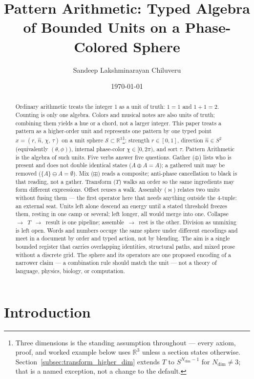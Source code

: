 \documentclass[12pt, a4paper]{article}
\title{Pattern Arithmetic: Typed Algebra of Bounded Units on a Phase-Colored Sphere}
\author{Sandeep Lakshminarayan Chiluveru}
\date{\today}
\begin{document}
\maketitle

\begin{abstract}
Ordinary arithmetic treats the integer 1 as a unit of truth: $1=1$ and $1+1=2$. Counting is only one algebra. Colors and musical notes are also units of truth; combining them yields a hue or a chord, not a larger integer. This paper treats a pattern as a higher-order unit and represents one pattern by one typed point
$x = (r,\,\hat n,\,\chi,\,\tau)$
on a unit sphere $\mathcal{S} \subset \mathbb{R}^3$\footnote{Three
dimensions is the standing assumption throughout --- every axiom,
proof, and worked example below uses $\mathbb{R}^3$ unless a section
states otherwise. Section~\ref{subsec:transform_higher_dim} extends
$T$ to $S^{N_{\mathrm{dim}}-1}$ for $N_{\mathrm{dim}}\ne3$; that is a
named exception, not a change to the default.}:
strength $r \in [0, 1]$,
direction $\hat n \in S^2$ (equivalently $(\theta,\phi)$),
internal phase-color $\chi \in [0, 2\pi)$,
and sort $\tau$.
Pattern Arithmetic is the algebra of such units. Five verbs answer
five questions. Gather ($\oplus$) lists who is present and does not
double identical states ($A \oplus A = A$); a gathered unit may be
removed ($\{A\} \ominus A = \emptyset$). Mix ($\boxplus$) reads a
composite; anti-phase cancellation to black is that reading, not a
gather. Transform ($T$) walks an order so the same ingredients may
form different expressions. Offset reuses a walk. Assembly
($\bowtie$) relates two units without fusing them --- the first
operator here that needs anything outside the 4-tuple: an external
seat. Units left alone descend an energy until a stated threshold
freezes them, resting in one camp or several; left longer, all would
merge into one. Collapse~$\to$~$T$~$\to$~result is
one pipeline; assemble~$\to$~rest is the other. Division as
unmixing is left open. Words and numbers occupy the same sphere under different encodings and meet in a document by order and typed action, not by blending. The aim is a single bounded register that carries overlapping identities, structural paths, and mixed prose without a discrete grid. The sphere and its operators are one proposed encoding of a narrower claim --- a combination rule should match the unit --- not a theory of language, physics, biology, or computation.
\end{abstract}

\section{Introduction}
\end{document}
